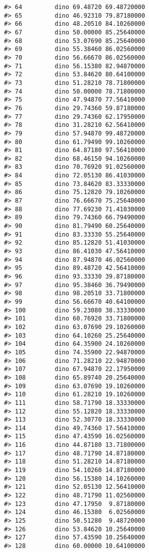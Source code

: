 \documentclass[
]{book}
\theoremstyle{definition}
\theoremstyle{definition}
\theoremstyle{definition}
\theoremstyle{definition}
\theoremstyle{remark}
\begin{document}
\begin{verbatim}
#> 64         dino 69.48720 69.48720000
#> 65         dino 46.92310 79.87180000
#> 66         dino 48.20510 84.10260000
#> 67         dino 50.00000 85.25640000
#> 68         dino 53.07690 85.25640000
#> 69         dino 55.38460 86.02560000
#> 70         dino 56.66670 86.02560000
#> 71         dino 56.15380 82.94870000
#> 72         dino 53.84620 80.64100000
#> 73         dino 51.28210 78.71800000
#> 74         dino 50.00000 78.71800000
#> 75         dino 47.94870 77.56410000
#> 76         dino 29.74360 59.87180000
#> 77         dino 29.74360 62.17950000
#> 78         dino 31.28210 62.56410000
#> 79         dino 57.94870 99.48720000
#> 80         dino 61.79490 99.10260000
#> 81         dino 64.87180 97.56410000
#> 82         dino 68.46150 94.10260000
#> 83         dino 70.76920 91.02560000
#> 84         dino 72.05130 86.41030000
#> 85         dino 73.84620 83.33330000
#> 86         dino 75.12820 79.10260000
#> 87         dino 76.66670 75.25640000
#> 88         dino 77.69230 71.41030000
#> 89         dino 79.74360 66.79490000
#> 90         dino 81.79490 60.25640000
#> 91         dino 83.33330 55.25640000
#> 92         dino 85.12820 51.41030000
#> 93         dino 86.41030 47.56410000
#> 94         dino 87.94870 46.02560000
#> 95         dino 89.48720 42.56410000
#> 96         dino 93.33330 39.87180000
#> 97         dino 95.38460 36.79490000
#> 98         dino 98.20510 33.71800000
#> 99         dino 56.66670 40.64100000
#> 100        dino 59.23080 38.33330000
#> 101        dino 60.76920 33.71800000
#> 102        dino 63.07690 29.10260000
#> 103        dino 64.10260 25.25640000
#> 104        dino 64.35900 24.10260000
#> 105        dino 74.35900 22.94870000
#> 106        dino 71.28210 22.94870000
#> 107        dino 67.94870 22.17950000
#> 108        dino 65.89740 20.25640000
#> 109        dino 63.07690 19.10260000
#> 110        dino 61.28210 19.10260000
#> 111        dino 58.71790 18.33330000
#> 112        dino 55.12820 18.33330000
#> 113        dino 52.30770 18.33330000
#> 114        dino 49.74360 17.56410000
#> 115        dino 47.43590 16.02560000
#> 116        dino 44.87180 13.71800000
#> 117        dino 48.71790 14.87180000
#> 118        dino 51.28210 14.87180000
#> 119        dino 54.10260 14.87180000
#> 120        dino 56.15380 14.10260000
#> 121        dino 52.05130 12.56410000
#> 122        dino 48.71790 11.02560000
#> 123        dino 47.17950  9.87180000
#> 124        dino 46.15380  6.02560000
#> 125        dino 50.51280  9.48720000
#> 126        dino 53.84620 10.25640000
#> 127        dino 57.43590 10.25640000
#> 128        dino 60.00000 10.64100000

\end{verbatim}
\end{document}

